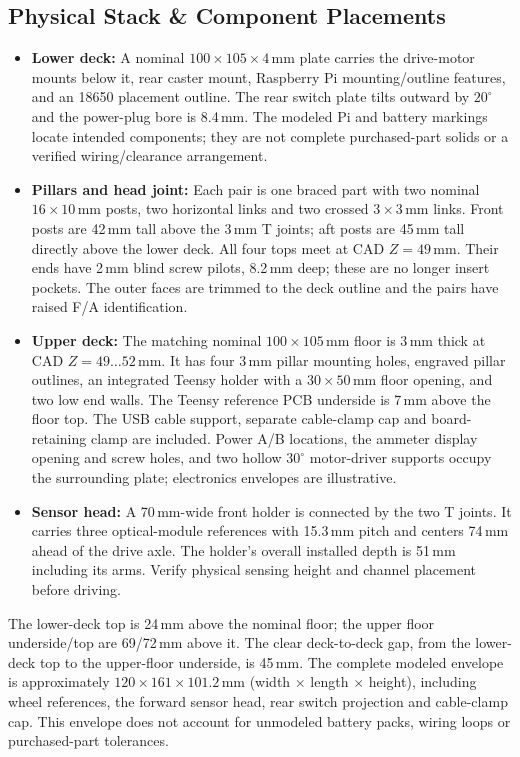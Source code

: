 \subsection{Physical Stack \& Component Placements}
\begin{itemize}
    \item \textbf{Lower deck:} A nominal $100\times105\times4$\,mm plate carries the drive-motor mounts below it, rear caster mount, Raspberry Pi mounting/outline features, and an 18650 placement outline. The rear switch plate tilts outward by $20^\circ$ and the power-plug bore is 8.4\,mm. The modeled Pi and battery markings locate intended components; they are not complete purchased-part solids or a verified wiring/clearance arrangement.
    \item \textbf{Pillars and head joint:} Each pair is one braced part with two nominal $16\times10$\,mm posts, two horizontal links and two crossed $3\times3$\,mm links. Front posts are 42\,mm tall above the 3\,mm T joints; aft posts are 45\,mm tall directly above the lower deck. All four tops meet at CAD $Z=49$\,mm. Their ends have 2\,mm blind screw pilots, 8.2\,mm deep; these are no longer insert pockets. The outer faces are trimmed to the deck outline and the pairs have raised F/A identification.
    \item \textbf{Upper deck:} The matching nominal $100\times105$\,mm floor is 3\,mm thick at CAD $Z=49\ldots52$\,mm. It has four 3\,mm pillar mounting holes, engraved pillar outlines, an integrated Teensy holder with a $30\times50$\,mm floor opening, and two low end walls. The Teensy reference PCB underside is 7\,mm above the floor top. The USB cable support, separate cable-clamp cap and board-retaining clamp are included. Power A/B locations, the ammeter display opening and screw holes, and two hollow $30^\circ$ motor-driver supports occupy the surrounding plate; electronics envelopes are illustrative.
    \item \textbf{Sensor head:} A 70\,mm-wide front holder is connected by the two T joints. It carries three optical-module references with 15.3\,mm pitch and centers 74\,mm ahead of the drive axle. The holder's overall installed depth is 51\,mm including its arms. Verify physical sensing height and channel placement before driving.
\end{itemize}
The lower-deck top is 24\,mm above the nominal floor; the upper floor underside/top are 69/72\,mm above it. The clear deck-to-deck gap, from the lower-deck top to the upper-floor underside, is 45\,mm. The complete modeled envelope is approximately $120\times161\times101.2$\,mm (width $\times$ length $\times$ height), including wheel references, the forward sensor head, rear switch projection and cable-clamp cap. This envelope does not account for unmodeled battery packs, wiring loops or purchased-part tolerances.

